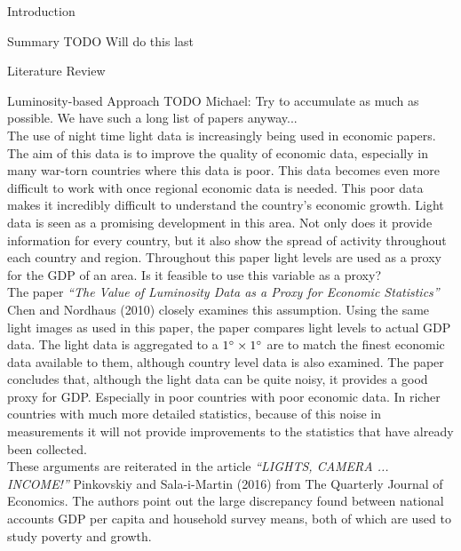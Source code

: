 \documentclass[12pt,fleqn,leqno,letterpaper]{article}
\begin{document}
\begin{section}{Introduction}
  \begin{subsection}{Summary}
    TODO Will do this last
  \end{subsection}
  \begin{subsection}{Literature Review}
    \begin{subsubsection}{Luminosity-based Approach}
      TODO Michael: Try to accumulate as much as possible. We have such a long list of papers anyway...\\
      The use of night time light data is increasingly being used in economic papers. The aim of this data is to improve the quality of economic data, especially in many war-torn countries where this data is poor. This data becomes even more difficult to work with once regional economic data is needed. This poor data makes it incredibly difficult to understand the country's economic growth. Light data is seen as a promising development in this area. Not only does it provide information for every country, but it also show the spread of activity throughout each country and region. Throughout this paper light levels are used as a proxy for the GDP of an area. Is it feasible to use this variable as a proxy? \\
      
      The paper \textit{``The Value of Luminosity Data as a Proxy for Economic Statistics''} Chen and Nordhaus (2010) closely examines this assumption. Using the same light images as used in this paper, the paper compares light levels to actual GDP data. The light data is aggregated to a $1\degree\times 1\degree$ are to match the finest economic data available to them, although country level data is also examined. The paper concludes that, although the light data can be quite noisy, it provides a good proxy for GDP. Especially in poor countries with poor economic data. In richer countries with much more detailed statistics, because of this noise in measurements it will not provide improvements to the statistics that have already been collected. \\
      
      These arguments are reiterated in the article \textit{``LIGHTS, CAMERA ... INCOME!''}  Pinkovskiy and Sala-i-Martin (2016) from The Quarterly Journal of Economics. The authors point out the large discrepancy found between national accounts GDP  per  capita and household survey means, both of which are used to study poverty and growth. \\
      

\end{subsubsection}
\end{subsection}
\end{section}
\end{document}
